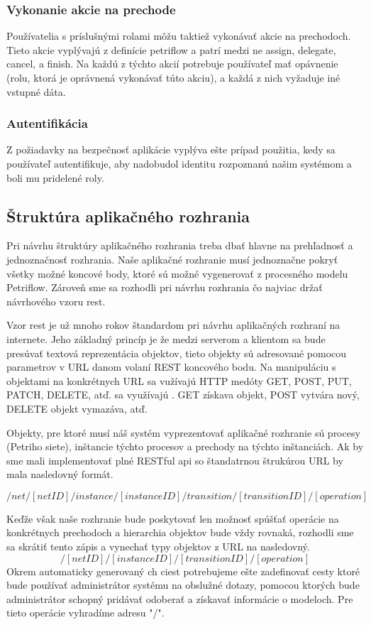 \subsubsection{Vykonanie akcie na prechode}
Používatelia s príslušnými rolami môžu taktiež vykonávať akcie na prechodoch. Tieto akcie vyplývajú z definície petriflow a patrí medzi ne assign, delegate, cancel, a finish. Na každú z týchto akcií potrebuje používateľ mať opávnenie (rolu, ktorá je oprávnená vykonávať túto akciu), a každá z nich vyžaduje iné vstupné dáta.

\subsubsection{Autentifikácia}
Z požiadavky na bezpečnosť aplikácie vyplýva ešte prípad použitia, kedy sa používateľ autentifikuje, aby nadobudol identitu rozpoznanú našim systémom a boli mu pridelené roly.

\subsection{Štruktúra aplikačného rozhrania}
Pri návrhu štruktúry aplikačného rozhrania treba dbať hlavne na prehľadnosť a jednoznačnosť rozhrania. Naše aplikačné rozhranie musí jednoznačne pokryť všetky možné koncové body, ktoré sú možné vygenerovať z procesného modelu Petriflow. Zároveň sme sa rozhodli pri návrhu rozhrania čo najviac držať návrhového vzoru \acrshort{rest}. 

Vzor \acrshort{rest} je už mnoho rokov štandardom pri návrhu aplikačných rozhraní na internete. Jeho základný princíp je že medzi serverom a klientom sa bude presúvať textová reprezentácia objektov, tieto objekty sú adresované pomocou parametrov v URL danom volaní REST koncového bodu. Na manipuláciu s objektami na konkrétnych URL sa vužívajú HTTP medóty GET, POST, PUT, PATCH, DELETE, atď.  sa využívajú . GET získava objekt, POST vytvára nový, DELETE objekt vymazáva, atď.

Objekty, pre ktoré musí náš systém vyprezentovať aplikačné rozhranie sú  procesy (Petriho siete), inštancie týchto procesov a prechody na týchto inštanciách. Ak by sme mali implementovať plné RESTful \acrshort{api} so štandatrnou štrukúrou URL by mala nasledovný formát.

\[/net/[netID]/instance/[instanceID]/transition/[transitionID]/[operation] \]

Keďže však naše rozhranie bude poskytovať len možnosť spúšťať operácie na konkrétnych prechodoch a hierarchia objektov bude vždy rovnaká, rozhodli sme sa skrátiť tento zápis a vynechať typy objektov z URL na nasledovný.
\[/[netID]/[instanceID]/[transitionID]/[operation] \]
Okrem automaticky generovaný ch ciest potrebujeme ešte zadefinovať cesty ktoré bude používať administrátor systému na obslužné dotazy, pomocou ktorých bude administrátor schopný pridávať odoberať a získavať informácie o modeloch. Pre tieto operácie vyhradíme adresu "/".

